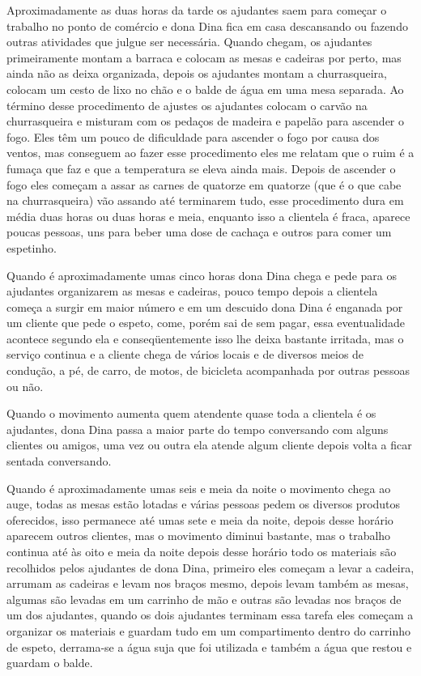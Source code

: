 Aproximadamente as duas horas da tarde os ajudantes saem para começar o trabalho no ponto de comércio e dona Dina fica em casa descansando ou fazendo outras atividades que julgue ser necessária. Quando chegam, os ajudantes primeiramente montam a barraca e colocam as mesas e cadeiras por perto, mas ainda não as deixa organizada, depois os ajudantes montam a churrasqueira, colocam um cesto de lixo no chão e o balde de água em uma mesa separada.
Ao término desse procedimento de ajustes os ajudantes colocam o carvão na churrasqueira e misturam com os pedaços de madeira e papelão para ascender o fogo. Eles têm um pouco de dificuldade para ascender o fogo por causa dos ventos, mas conseguem ao fazer esse procedimento eles me relatam que o ruim é a fumaça que faz e que a temperatura se eleva ainda mais. Depois de ascender o fogo eles começam a assar as carnes de quatorze em quatorze (que é o que cabe na churrasqueira) vão assando até terminarem tudo, esse procedimento dura em média duas horas ou duas horas e meia, enquanto isso a clientela é fraca, aparece poucas pessoas, uns para beber uma dose de cachaça e outros para comer um espetinho.

Quando é aproximadamente umas cinco horas dona Dina chega e pede para os ajudantes organizarem as mesas e cadeiras, pouco tempo depois a clientela começa a surgir em maior número e em um descuido dona Dina é enganada por um cliente que pede o espeto, come, porém sai de sem pagar, essa eventualidade acontece segundo ela e conseqüentemente isso lhe deixa bastante irritada, mas o serviço continua e a cliente chega de vários locais e de diversos meios de condução, a pé, de carro, de motos, de bicicleta acompanhada por outras pessoas ou não.

Quando o movimento aumenta quem atendente quase toda a clientela é os ajudantes, dona Dina passa a maior parte do tempo conversando com alguns clientes ou amigos, uma vez ou outra ela atende algum cliente depois volta a ficar sentada conversando. 

Quando é aproximadamente umas seis e meia da noite o movimento chega ao auge, todas as mesas estão lotadas e várias pessoas pedem os diversos produtos oferecidos, isso permanece até umas sete e meia da noite, depois desse horário aparecem outros clientes, mas o movimento diminui bastante, mas o trabalho continua até às oito e meia da noite depois desse horário todo os materiais são recolhidos pelos ajudantes de dona Dina, primeiro eles começam a levar a cadeira, arrumam as cadeiras e levam nos braços mesmo, depois levam também as mesas, algumas são levadas em um carrinho de mão e outras são levadas nos braços de um dos ajudantes, quando os dois ajudantes terminam essa tarefa eles começam a organizar os materiais e guardam tudo em um compartimento dentro do carrinho de espeto, derrama-se a água suja que foi utilizada e também a água que restou e guardam o balde.

